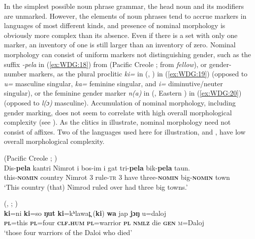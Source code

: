\documentclass[output=collectionpaper]{langsci/langscibook}
\begin{document}
In the simplest possible noun phrase grammar, the head noun and its modifiers are unmarked. However, the elements of noun phrases tend to accrue markers in languages of most different kinds, and presence of nominal morphology is obviously more complex than its absence. Even if there is a set with only one marker, an inventory of one is still larger than an inventory of zero. Nominal morphology can consist of uniform markers not distinguishing gender, such as the suffix \textit{-pela} in (\ref{ex:WDG:18}) from  (Pacific Creole ; from  \textit{fellow}), or gender-number markers, as the plural proclitic \textit{ki=} in  (, ) in (\ref{ex:WDG:19}) (opposed to \textit{u=} masculine singular, \textit{ka=} feminine singular, and \textit{i=} diminutive/neuter singular), or the feminine gender marker \textit{n(a)} in  (, Eastern ) in (\ref{ex:WDG:20}) (opposed to \textit{l(ɔ)} masculine). Accumulation of nominal morphology, including gender marking, does not seem to correlate with high overall morphological complexity (see ). As the clitics in  illustrate, nominal morphology need not consist of affixes. Two of the languages used here for illustration,  and , have low overall morphological complexity.

\ea\label{ex:WDG:18}
 (Pacific Creole ; \citealt[417]{Verhaar1995})\\
\gll Dis-\textbf{pela}	kantri	Nimrot	i	bos-im	i	gat	tri-\textbf{pela}	bik-\textbf{pela}	taun.\\
	this-\textbf{\textsc{nomin}}	country	Nimrot	3	rule-\textsc{tr}	3	have	three-\textbf{\textsc{nomin}}	big-\textbf{\textsc{nomin}}	town\\
\glt	`This country (that) Nimrod ruled over had three big towns.'\\
\z

\ea\label{ex:WDG:19}
 (, ; \citealt[339]{Ring2015})\\
\gll	\textbf{ki}=ni	\textbf{ki}=so	\textbf{ŋut}	\textbf{ki}=kʰlawat̪	(\textbf{ki})	\textbf{wa}	jap	\textbf{jɔŋ}	u=daloj\\
	\textbf{\textsc{pl}}=this	\textbf{\textsc{pl}}=four	\textbf{\textsc{clf.hum}}	\textbf{\textsc{pl}}=warrior	\textbf{\textsc{pl}}	\textbf{\textsc{nmlz}}	die	\textbf{\textsc{gen}}	\textsc{m}=Daloj\\
\glt	`those four warriors of the Daloi who died'\\
\z
\end{document}
